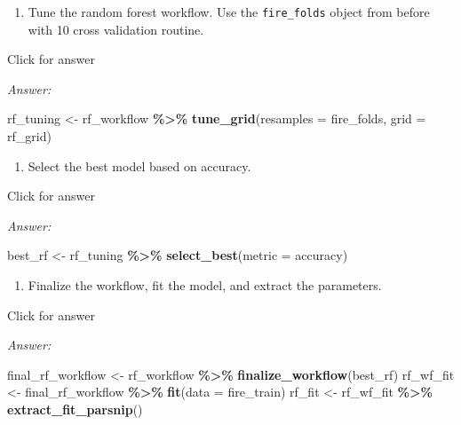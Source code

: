 \documentclass[
]{book}
\newenvironment{Shaded}{\begin{snugshade}}{\end{snugshade}}
\newcommand{\AttributeTok}[1]{\textcolor[rgb]{0.13,0.29,0.53}{#1}}
\newcommand{\FunctionTok}[1]{\textcolor[rgb]{0.13,0.29,0.53}{\textbf{#1}}}
\newcommand{\NormalTok}[1]{#1}
\newcommand{\OtherTok}[1]{\textcolor[rgb]{0.56,0.35,0.01}{#1}}
\newcommand{\SpecialCharTok}[1]{\textcolor[rgb]{0.81,0.36,0.00}{\textbf{#1}}}
\newcommand{\StringTok}[1]{\textcolor[rgb]{0.31,0.60,0.02}{#1}}
\providecommand{\tightlist}{%
  \setlength{\itemsep}{0pt}\setlength{\parskip}{0pt}}
\begin{document}
\begin{enumerate}
\def\labelenumi{\alph{enumi}.}
\setcounter{enumi}{3}
\tightlist
\item
  Tune the random forest workflow. Use the \texttt{fire\_folds} object from before with 10 cross validation routine.
\end{enumerate}

Click for answer

\emph{Answer:}

\begin{Shaded}
\begin{Highlighting}[]
\NormalTok{rf\_tuning }\OtherTok{\textless{}{-}}\NormalTok{ rf\_workflow }\SpecialCharTok{\%\textgreater{}\%} 
             \FunctionTok{tune\_grid}\NormalTok{(}\AttributeTok{resamples =}\NormalTok{ fire\_folds,}
                       \AttributeTok{grid =}\NormalTok{ rf\_grid)}
\end{Highlighting}
\end{Shaded}

\begin{enumerate}
\def\labelenumi{\alph{enumi}.}
\setcounter{enumi}{4}
\tightlist
\item
  Select the best model based on accuracy.
\end{enumerate}

Click for answer

\emph{Answer:}

\begin{Shaded}
\begin{Highlighting}[]
\NormalTok{best\_rf }\OtherTok{\textless{}{-}}\NormalTok{ rf\_tuning }\SpecialCharTok{\%\textgreater{}\%} 
           \FunctionTok{select\_best}\NormalTok{(}\AttributeTok{metric =} \StringTok{\textquotesingle{}accuracy\textquotesingle{}}\NormalTok{)}
\end{Highlighting}
\end{Shaded}

\begin{enumerate}
\def\labelenumi{\alph{enumi}.}
\setcounter{enumi}{5}
\tightlist
\item
  Finalize the workflow, fit the model, and extract the parameters.
\end{enumerate}

Click for answer

\emph{Answer:}

\begin{Shaded}
\begin{Highlighting}[]
\NormalTok{final\_rf\_workflow }\OtherTok{\textless{}{-}}\NormalTok{ rf\_workflow }\SpecialCharTok{\%\textgreater{}\%} 
                     \FunctionTok{finalize\_workflow}\NormalTok{(best\_rf)}
\NormalTok{rf\_wf\_fit }\OtherTok{\textless{}{-}}\NormalTok{ final\_rf\_workflow }\SpecialCharTok{\%\textgreater{}\%} 
             \FunctionTok{fit}\NormalTok{(}\AttributeTok{data =}\NormalTok{ fire\_train)}
\NormalTok{rf\_fit }\OtherTok{\textless{}{-}}\NormalTok{ rf\_wf\_fit }\SpecialCharTok{\%\textgreater{}\%} 
          \FunctionTok{extract\_fit\_parsnip}\NormalTok{()}
\end{Highlighting}
\end{Shaded}
\end{document}
